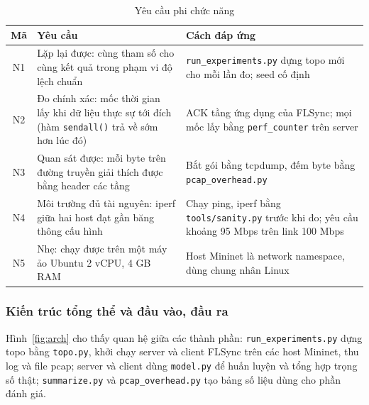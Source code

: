 \begin{table}[H]
    \centering
    \caption{Yêu cầu phi chức năng}
    \label{tab:req-nonfunc}
    \begin{tabularx}{\textwidth}{c >{\raggedright\arraybackslash}X >{\raggedright\arraybackslash}X}
        \toprule
        \textbf{Mã} & \textbf{Yêu cầu} & \textbf{Cách đáp ứng} \\
        \midrule
        N1 & Lặp lại được: cùng tham số cho cùng kết quả trong phạm vi độ lệch chuẩn & \texttt{run\_experiments.py} dựng topo mới cho mỗi lần đo; seed cố định \\
        N2 & Đo chính xác: mốc thời gian lấy khi dữ liệu thực sự tới đích (hàm \texttt{sendall()} trả về sớm hơn lúc đó) & ACK tầng ứng dụng của FLSync; mọi mốc lấy bằng \texttt{perf\_counter} trên server \\
        N3 & Quan sát được: mỗi byte trên đường truyền giải thích được bằng header các tầng & Bắt gói bằng tcpdump, đếm byte bằng \texttt{pcap\_overhead.py} \\
        N4 & Môi trường đủ tài nguyên: iperf giữa hai host đạt gần băng thông cấu hình & Chạy ping, iperf bằng \texttt{tools/sanity.py} trước khi đo; yêu cầu khoảng 95 Mbps trên link 100 Mbps \\
        N5 & Nhẹ: chạy được trên một máy ảo Ubuntu 2 vCPU, 4 GB RAM & Host Mininet là network namespace, dùng chung nhân Linux \\
        \bottomrule
    \end{tabularx}
\end{table}

\subsubsection{Kiến trúc tổng thể và đầu vào, đầu ra}
Hình~\ref{fig:arch} cho thấy quan hệ giữa các thành phần: \texttt{run\_experiments.py} dựng topo bằng \texttt{topo.py}, khởi chạy server và client FLSync trên các host Mininet, thu log và file pcap; server và client dùng \texttt{model.py} để huấn luyện và tổng hợp trọng số thật; \texttt{summarize.py} và \texttt{pcap\_overhead.py} tạo bảng số liệu dùng cho phần đánh giá.

